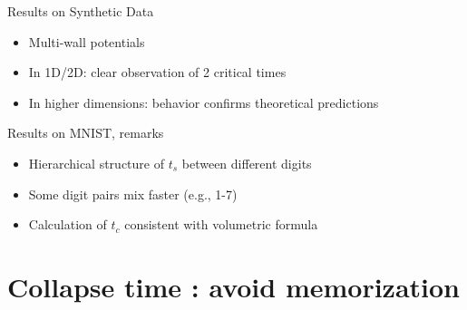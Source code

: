 \documentclass[aspectratio=169]{beamer}
\begin{document}
\begin{frame}{Results on Synthetic Data}
    \begin{itemize}
        \item Multi-wall potentials
        \item In 1D/2D: clear observation of 2 critical times
        \item In higher dimensions: behavior confirms theoretical predictions
    \end{itemize}
    
    \begin{center}
    \end{center}
\end{frame}


\begin{frame}{Results on MNIST, remarks}
    \begin{itemize}
        \item Hierarchical structure of $t_s$ between different digits
        \item Some digit pairs mix faster (e.g., 1-7)
        \item Calculation of $t_c$ consistent with volumetric formula
    \end{itemize}
\end{frame}















\section{Collapse time : avoid memorization}
\end{document}

